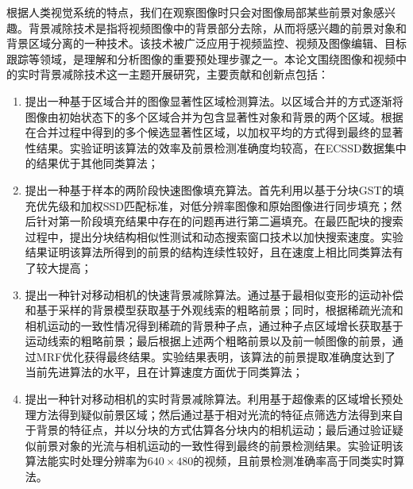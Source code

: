 \begin{cabstract}
根据人类视觉系统的特点，我们在观察图像时只会对图像局部某些前景对象感兴趣。背景减除技术是指将视频图像中的背景部分去除，从而将感兴趣的前景对象和背景区域分离的一种技术。该技术被广泛应用于视频监控、视频及图像编辑、目标跟踪等领域，是理解和分析图像的重要预处理步骤之一。本论文围绕图像和视频中的实时背景减除技术这一主题开展研究，主要贡献和创新点包括：
\begin{enumerate}
  \item 提出一种基于区域合并的图像显著性区域检测算法。以区域合并的方式逐渐将图像由初始状态下的多个区域合并为包含显著性对象和背景的两个区域。根据在合并过程中得到的多个候选显著性区域，以加权平均的方式得到最终的显著性结果。实验证明该算法的效率及前景检测准确度均较高，在ECSSD数据集中的结果优于其他同类算法；

  \item 提出一种基于样本的两阶段快速图像填充算法。首先利用以基于分块GST的填充优先级和加权SSD匹配标准，对低分辨率图像和原始图像进行同步填充；然后针对第一阶段填充结果中存在的问题再进行第二遍填充。在最匹配块的搜索过程中，提出分块结构相似性测试和动态搜索窗口技术以加快搜索速度。实验结果证明该算法所得到的前景的结构连续性较好，且在速度上相比同类算法有了较大提高；
  \item 提出一种针对移动相机的快速背景减除算法。通过基于最相似变形的运动补偿和基于采样的背景模型获取基于外观线索的粗略前景；同时，根据稀疏光流和相机运动的一致性情况得到稀疏的背景种子点，通过种子点区域增长获取基于运动线索的粗略前景；最后根据上述两个粗略前景以及前一帧图像的前景，通过MRF优化获得最终结果。实验结果表明，该算法的前景提取准确度达到了当前先进算法的水平，且在计算速度方面优于同类算法；
  \item 提出一种针对移动相机的实时背景减除算法。利用基于超像素的区域增长预处理方法得到疑似前景区域；然后通过基于相对光流的特征点筛选方法得到来自于背景的特征点，并以分块的方式估算各分块内的相机运动；最后通过验证疑似前景对象的光流与相机运动的一致性得到最终的前景检测结果。实验证明该算法能实时处理分辨率为$640 \times 480$的视频，且前景检测准确率高于同类实时算法。
\end{enumerate}

\end{cabstract}


